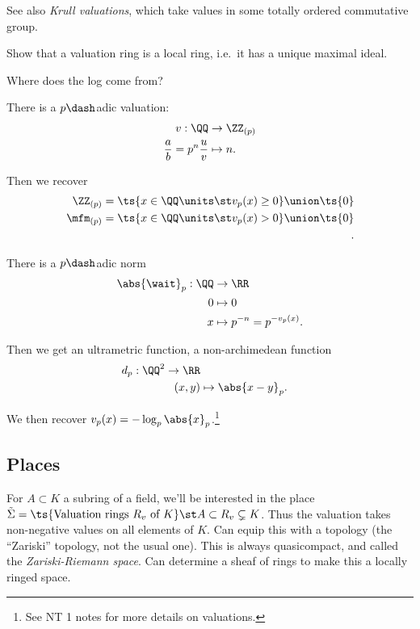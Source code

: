 See also \emph{Krull valuations}, which take values in some totally
ordered commutative group.

\begin{exercise}

Show that a valuation ring is a local ring, i.e.~it has a unique maximal
ideal.

\end{exercise}

\begin{example}

Where does the log come from?

There is a \(p\dash\)adic valuation:
\begin{align*}  
v: \QQ &\to \ZZ_{(p)} \\
{a\over b} = p^n {u \over v} &\mapsto n
.\end{align*}

Then we recover
\begin{align*}  
\ZZ_{(p)} = \ts {x\in \QQ\units \st v_p(x) \geq 0} \union \ts{0} \\
\mfm_{(p)} = \ts {x\in \QQ\units \st v_p(x) > 0} \union \ts{0} \\
.\end{align*}

There is a \(p\dash\)adic norm
\begin{align*}  
\abs{\wait}_p: \QQ &\to \RR \\
0 & \mapsto 0 \\
x &\mapsto p^{-n} = p^{-v_p(x)}
.\end{align*}

Then we get an ultrametric function, a non-archimedean function
\begin{align*}  
d_p: \QQ^2 \to \RR \\
(x, y) &\mapsto \abs{x- y}_p
.\end{align*}

We then recover \(v_p(x) = -\log_p \abs{x}_p\).\footnote{See NT 1 notes
  for more details on valuations.}

\end{example}

\hypertarget{places}{%
\subsection{Places}\label{places}}

For \(A\subset K\) a subring of a field, we'll be interested in the
place
\(\tilde \Sigma = \ts{\text{Valuation rings } R_v \text{ of } K} \st A \subset R_v \subsetneq K\).
Thus the valuation takes non-negative values on all elements of \(K\).
Can equip this with a topology (the ``Zariski'' topology, not the usual
one). This is always quasicompact, and called the \emph{Zariski-Riemann
space}. Can determine a sheaf of rings to make this a locally ringed
space.

